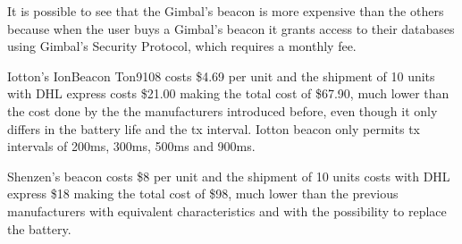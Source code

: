 \begin{table}[!htb]
  \renewcommand{\arraystretch}{1.5} %
  \centering
  \caption[Manufacturers' Beacons Differences]{Manufacturers' Beacons Differences.}
  \label{tab:manufdif}
\end{table}

It is possible to see that the Gimbal's beacon is more expensive than the others because when the user buys a Gimbal's beacon it grants access to their databases using Gimbal's Security Protocol, which requires a monthly fee.

Iotton's IonBeacon Ton9108 costs \$4.69 per unit and the shipment of 10 units with DHL express costs \$21.00 making the total cost of \$67.90, much lower than the cost done by the the manufacturers introduced before, even though it only differs in the battery life and the \gls{tx} interval. Iotton beacon only permits \gls{tx} intervals of 200ms, 300ms, 500ms and 900ms.

Shenzen's beacon costs \$8 per unit and the shipment of 10 units costs with DHL express \$18 making the total cost of \$98, much lower than the previous manufacturers with equivalent characteristics and with the possibility to replace the battery.

